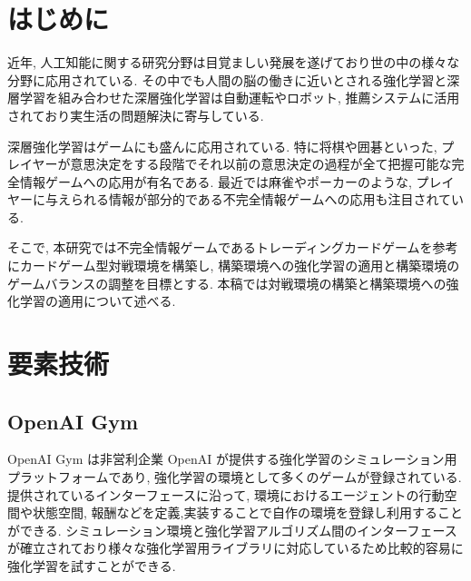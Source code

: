 \documentclass[twocolumn]{jarticle}
\begin{document}

\section{はじめに}
近年, 人工知能に関する研究分野は目覚ましい発展を遂げており世の中の様々な分野に応用されている. その中でも人間の脳の働きに近いとされる強化学習と深層学習を組み合わせた深層強化学習は自動運転やロボット, 推薦システムに活用されており実生活の問題解決に寄与している.\par
深層強化学習はゲームにも盛んに応用されている.
特に将棋や囲碁といった, プレイヤーが意思決定をする段階でそれ以前の意思決定の過程が全て把握可能な完全情報ゲームへの応用が有名である. 
最近では麻雀やポーカーのような, プレイヤーに与えられる情報が部分的である不完全情報ゲームへの応用も注目されている.
\par
そこで, 本研究では不完全情報ゲームであるトレーディングカードゲームを参考にカードゲーム型対戦環境を構築し, 構築環境への強化学習の適用と構築環境のゲームバランスの調整を目標とする. 本稿では対戦環境の構築と構築環境への強化学習の適用について述べる.

\section{要素技術}

\subsection{OpenAI Gym}
OpenAI Gym \cite{OpenAIGym} は非営利企業 OpenAI が提供する強化学習のシミュレーション用プラットフォームであり, 強化学習の環境として多くのゲームが登録されている. 提供されているインターフェースに沿って, 環境におけるエージェントの行動空間や状態空間, 報酬などを定義,実装することで自作の環境を登録し利用することができる. シミュレーション環境と強化学習アルゴリズム間のインターフェースが確立されており様々な強化学習用ライブラリに対応しているため比較的容易に強化学習を試すことができる.
\end{document}
